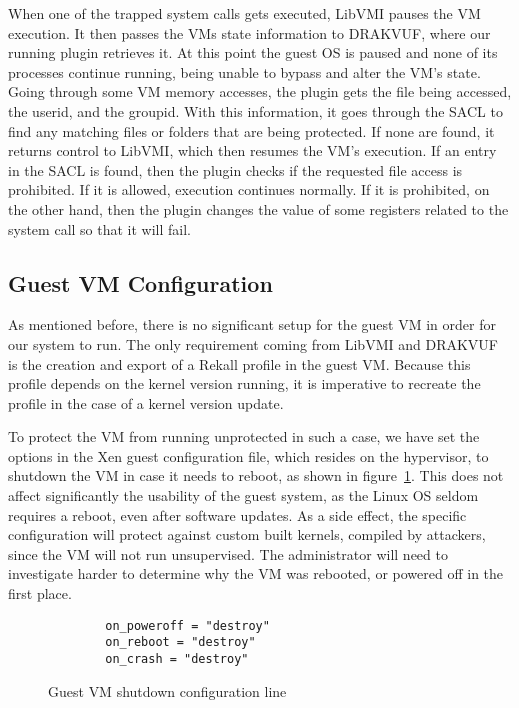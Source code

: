 \par When one of the trapped system calls gets executed, LibVMI pauses the \ac{VM} execution. It then passes the \ac{VM}s state information to DRAKVUF, where our running plugin retrieves it. At this point the guest \ac{OS} is paused and none of its processes continue running, being unable to bypass and alter the \ac{VM}'s state. Going through some \ac{VM} memory accesses, the plugin gets the file being accessed, the userid, and the groupid. With this information, it goes through the \ac{SACL} to find any matching files or folders that are being protected. If none are found, it returns control to LibVMI, which then resumes the \ac{VM}'s execution. If an entry in the \ac{SACL} is found, then the plugin checks if the requested file access is prohibited. If it is allowed, execution continues normally. If it is prohibited, on the other hand, then the plugin changes the value of some registers related to the system call so that it will fail.







\subsection{Guest \ac{VM} Configuration}\label{sub:conf}

As mentioned before, there is no significant setup for the guest \ac{VM} in order for our system to run. The only requirement coming from LibVMI and DRAKVUF is the creation and export of a Rekall profile in the guest \ac{VM}. Because this profile depends on the kernel version running, it is imperative to recreate the profile in the case of a kernel version update. 

\par To protect the \ac{VM} from running unprotected in such a case, we have set the options in the Xen guest configuration file, which resides on the hypervisor, to shutdown the \ac{VM} in case it needs to reboot, as shown in figure~\ref{fig:conf}. This does not affect significantly the usability of the guest system, as the Linux \ac{OS} seldom requires a reboot, even after software updates. As a side effect, the specific configuration will protect against custom built kernels, compiled by attackers, since the \ac{VM} will not run unsupervised. The administrator will need to investigate harder to determine why the \ac{VM} was rebooted, or powered off in the first place.

\begin{figure}[ht]
	\centering
	\begin{lstlisting}
		on_poweroff = "destroy"
		on_reboot = "destroy"
		on_crash = "destroy"
	\end{lstlisting}
	\caption{Guest \ac{VM} shutdown configuration line}
	\label{fig:conf}
\end{figure}

